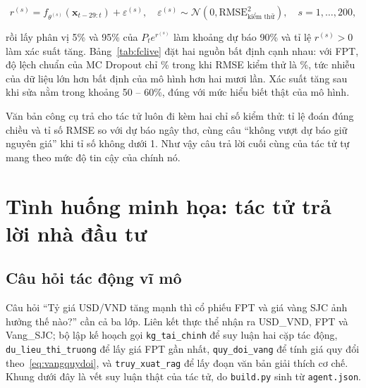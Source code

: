 \begin{equation}\label{eq:khoangdubao}
  r^{(s)} = f_{\theta^{(s)}}(\mathbf{x}_{t-29:t}) + \varepsilon^{(s)}, \quad
  \varepsilon^{(s)} \sim \mathcal{N}\!\left(0, \mathrm{RMSE}^2_{\text{kiểm thử}}\right), \quad s = 1, \dots, 200,
\end{equation}

\noindent rồi lấy phân vị 5\% và 95\% của $P_t e^{r^{(s)}}$ làm khoảng dự báo 90\% và tỉ lệ $r^{(s)} > 0$ làm xác suất
tăng. Bảng~\ref{tab:fclive} đặt hai nguồn bất định cạnh nhau: với FPT, độ lệch chuẩn của MC Dropout chỉ
\% trong khi RMSE kiểm thử là \%, tức nhiễu của dữ
liệu lớn hơn bất định của mô hình hơn hai mươi lần. Xác suất tăng sau khi sửa nằm trong khoảng 50 -- 60\%, đúng với
mức hiểu biết thật của mô hình.



Văn bản công cụ trả cho tác tử luôn đi kèm hai chỉ số kiểm thử: tỉ lệ đoán đúng chiều và tỉ số RMSE so với dự báo
ngây thơ, cùng câu ``không vượt dự báo giữ nguyên giá'' khi tỉ số không dưới 1. Như vậy câu trả lời cuối cùng của tác
tử tự mang theo mức độ tin cậy của chính nó.

\section{Tình huống minh họa: tác tử trả lời nhà đầu tư}\label{sec:tc-tinhhuong}
\subsection{Câu hỏi tác động vĩ mô}
Câu hỏi ``Tỷ giá USD/VND tăng mạnh thì cổ phiếu FPT và giá vàng SJC ảnh hưởng thế nào?'' cần cả ba lớp. Liên kết
thực thể nhận ra \textsf{USD\_VND}, \textsf{FPT} và \textsf{Vang\_SJC}; bộ lập kế hoạch gọi \texttt{kg\_tai\_chinh}
để suy luận hai cặp tác động, \texttt{du\_lieu\_thi\_truong} để lấy giá FPT gần nhất, \texttt{quy\_doi\_vang} để tính
giá quy đổi theo~\eqref{eq:vangquydoi}, và \texttt{truy\_xuat\_rag} để lấy đoạn văn bản giải thích cơ chế. Khung
dưới đây là vết suy luận thật của tác tử, do \texttt{build.py} sinh từ \texttt{agent.json}.

